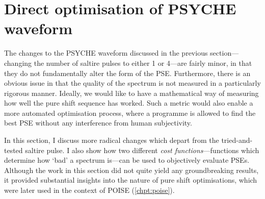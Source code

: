 \section{Direct optimisation of PSYCHE waveform}
\label{sec:pureshift__optimisation}

The changes to the PSYCHE waveform discussed in the previous section---changing the number of saltire pulses to either 1 or 4---are fairly minor, in that they do not fundamentally alter the form of the PSE.
Furthermore, there is an obvious issue in that the quality of the spectrum is not measured in a particularly rigorous manner.
Ideally, we would like to have a mathematical way of measuring how well the pure shift sequence has worked.
Such a metric would also enable a more automated optimisation process, where a programme is allowed to find the best PSE without any interference from human subjectivity.

In this section, I discuss more radical changes which depart from the tried-and-tested saltire pulse.
I also show how two different \textit{cost functions}---functions which determine how `bad' a spectrum is---can be used to objectively evaluate PSEs.
Although the work in this section did not quite yield any groundbreaking results, it provided substantial insights into the nature of pure shift optimisations, which were later used in the context of POISE (\cref{chpt:poise}).




